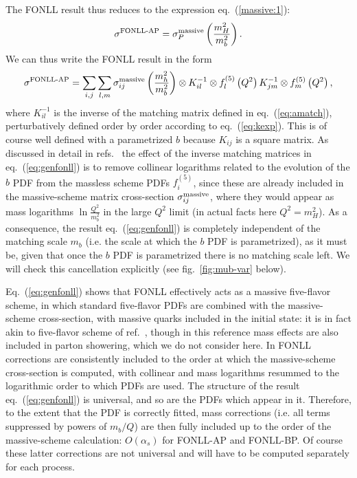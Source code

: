 The FONLL
result thus reduces to the expression eq.~(\ref{massive:1}):
\begin{equation}\label{eq:canc}
\sigma^{\text{FONLL-AP}}=\sigma_P^{\rm
  massive}\left(\frac{m_H^2}{m_b^2}\right).
\end{equation}
We can thus write the FONLL result in the form
\begin{equation}\label{eq:genfonll}
\sigma^{\text{FONLL-AP}}= \sum_{i,j}\sum_{l,m} \sigma^{\rm massive}_{ij}\left(\frac{m_h^2}{m^2_b}\right)\otimes
 K^{-1}_{il}\otimes f_{l}^{\left(5\right)}\left(Q^2\right)K^{-1}_{jm}\otimes f_{m}^{\left(5\right)}\left(Q^2\right),
\end{equation}
where $ K^{-1}_{il}$ is the inverse of the matching matrix defined in
eq.~(\ref{eq:amatch}), perturbatively defined order by order according
to eq.~(\ref{eq:kexp}). This is
of course  well defined with a parametrized $b$ because
$K_{ij}$ is  a square matrix. As discussed in detail in
refs.~\cite{Ball:2015tna,Ball:2015dpa} the effect of the inverse
matching matrices in eq.~(\ref{eq:genfonll}) is to remove collinear
logarithms related to the evolution of the $b$ PDF from the massless scheme
PDFs $f_{i}^{\left(5\right)}$, since these are already included in the
massive-scheme matrix cross-section  $\sigma^{\rm massive}_{ij}$,
where they would appear as mass logarithms $\ln\frac{Q^2}{m_b^2}$
in the large $Q^2$ limit (in actual facts here $Q^2=m_H^2$). As a
consequence, the result eq.~(\ref{eq:genfonll}) is completely
independent of the matching scale $m_b$ (i.e. the scale at which the
$b$ PDF is parametrized), as it must be, given that once
the $b$ PDF is parametrized there is no matching scale left.
We will check this cancellation explicitly (see 
fig.~\ref{fig:mub-var} below).

Eq.~(\ref{eq:genfonll}) shows that FONLL effectively acts
as a massive five-flavor scheme, in which standard five-flavor PDFs
are combined with the massive-scheme cross-section, with massive
quarks included in the initial state: it is in fact akin to 
five-flavor scheme of ref.~\cite{Krauss:2017wmx}, though in this
reference mass effects are also included in parton showering, which we
do not consider here. In FONLL corrections are consistently
included to the order at which the massive-scheme cross-section is
computed, with collinear and mass logarithms resummed to the logarithmic
order to which PDFs are used. The structure of the result
eq.~(\ref{eq:genfonll}) is universal, and so are the PDFs which appear
in it. Therefore, to the extent that the  PDF is correctly fitted,
mass corrections (i.e. all terms suppressed by powers of $m_b/Q$) are
then fully included  up to the order of the massive-scheme
calculation:   $O(\alpha_s)$ for FONLL-AP and FONLL-BP. Of course
these latter corrections are not universal and will have to be computed
separately for each process.

